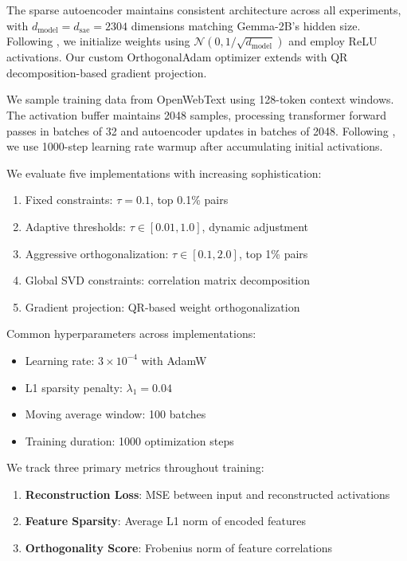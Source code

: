 \documentclass{article} %
\begin{document}
The sparse autoencoder maintains consistent architecture across all experiments, with $d_{\text{model}} = d_{\text{sae}} = 2304$ dimensions matching Gemma-2B's hidden size. Following \cite{goodfellow2016deep}, we initialize weights using $\mathcal{N}(0, 1/\sqrt{d_{\text{model}}})$ and employ ReLU activations. Our custom OrthogonalAdam optimizer extends \cite{kingma2014adam} with QR decomposition-based gradient projection.

We sample training data from OpenWebText \cite{radford2019language} using 128-token context windows. The activation buffer maintains 2048 samples, processing transformer forward passes in batches of 32 and autoencoder updates in batches of 2048. Following \cite{vaswani2017attention}, we use 1000-step learning rate warmup after accumulating initial activations.

We evaluate five implementations with increasing sophistication:
\begin{enumerate}
    \item Fixed constraints: $\tau = 0.1$, top 0.1\% pairs
    \item Adaptive thresholds: $\tau \in [0.01, 1.0]$, dynamic adjustment
    \item Aggressive orthogonalization: $\tau \in [0.1, 2.0]$, top 1\% pairs
    \item Global SVD constraints: correlation matrix decomposition
    \item Gradient projection: QR-based weight orthogonalization
\end{enumerate}

Common hyperparameters across implementations:
\begin{itemize}
    \item Learning rate: $3 \times 10^{-4}$ with AdamW \cite{loshchilov2017adamw}
    \item L1 sparsity penalty: $\lambda_1 = 0.04$
    \item Moving average window: 100 batches
    \item Training duration: 1000 optimization steps
\end{itemize}

We track three primary metrics throughout training:
\begin{enumerate}
    \item \textbf{Reconstruction Loss}: MSE between input and reconstructed activations
    \item \textbf{Feature Sparsity}: Average L1 norm of encoded features
    \item \textbf{Orthogonality Score}: Frobenius norm of feature correlations
\end{enumerate}
\end{document}
